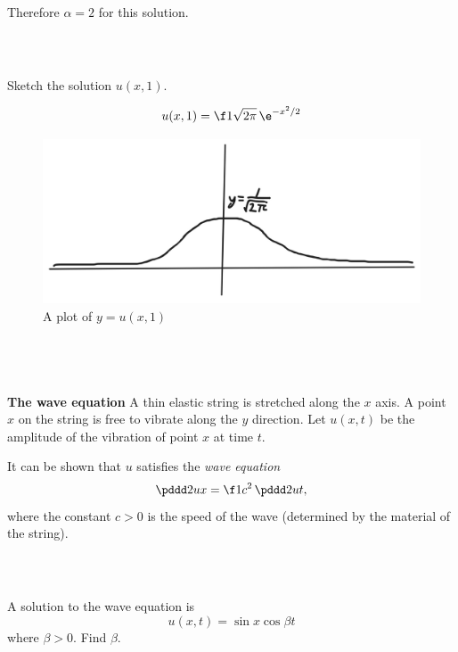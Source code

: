 \documentclass[a4paper]{article}
\begin{document}
Therefore $\alpha = 2$ for this solution.

\subsubsection{~} %

\begin{questionbody}
Sketch the solution $u(x, 1)$.
\end{questionbody}%
%
$$u(x, 1) = \f1{\sqrt{2\pi}}\, \e^{-x^2 / 2}$$

\begin{figure}[h]
	\centering
	\includegraphics[scale=0.35]{Q1a-ii}
	\caption{A plot of $y = u(x,1)$}
\end{figure}

\subsection{~} %

\begin{questionbody}
\textbf{The wave equation} \quad
A thin elastic string is stretched along the $x$ axis. A point $x$ on the string is free to vibrate along the $y$ direction. Let $u(x, t)$ be the amplitude of the vibration of point $x$ at time $t$.

It can be shown that $u$ satisfies the \textit{wave equation} \[
\pddd 2ux = \f1{c^2}\, \pddd 2ut,
\] where the constant $c > 0$ is the speed of the wave (determined by the material of the string).
\end{questionbody}

\subsubsection{~} %

\begin{questionbody}
A solution to the wave equation is \[
u(x, t) = \sin x \cos \beta t
\] where $\beta > 0$. Find $\beta$.
\end{questionbody}
\end{document}
